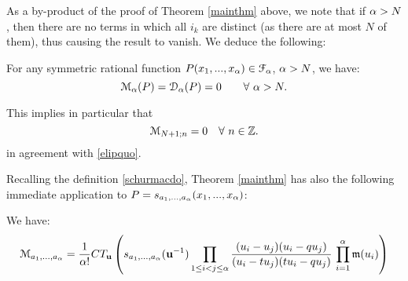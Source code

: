 As a by-product of the proof of Theorem \ref{mainthm} above, we note that if ${\alpha}>N$, then there are no terms in
which all $i_k$ are distinct (as there are at most $N$ of them), thus causing the result to vanish. 
We deduce the following:

\begin{cor}\label{vanicor}
For any symmetric rational function $P(x_1,...,x_{\alpha})\in {\mathcal F}_{\alpha}$, ${\alpha}>N$, we have:
\begin{equation}\label{vanimac}   {\mathcal M}_{\alpha}(P)= {\mathcal D}_{\alpha}(P) =0\qquad \forall\ {\alpha}>N .
\end{equation}
\end{cor}

This implies in particular that 
\begin{equation}\label{macvani}
{\mathcal M}_{N+1;n}=0 \quad \forall\ n\in {\mathbb Z} .
\end{equation}
in agreement with \eqref{elipquo}.

Recalling the definition \eqref{schurmacdo}, 
Theorem \ref{mainthm} has also the following immediate application to $P=s_{a_1,...,a_{\alpha}}(x_1,...,x_{\alpha})$:

\begin{cor}\label{corctMqt}
We have:
\begin{equation}\label{ctMqt}
{\mathcal M}_{a_1,...,a_{\alpha}}=\frac{1}{{\alpha}!}CT_{\mathbf u}\left( s_{a_1,...,a_{\alpha}}({\mathbf u}^{-1}) \prod_{1\leq i<j\leq {\alpha}} \frac{(u_i-u_j)
(u_i-q u_j)}{(u_i-t u_j)(t u_i-q u_j)}
\, \prod_{i=1}^{\alpha} {\mathfrak m}(u_i)\right)
\end{equation}
\end{cor}

